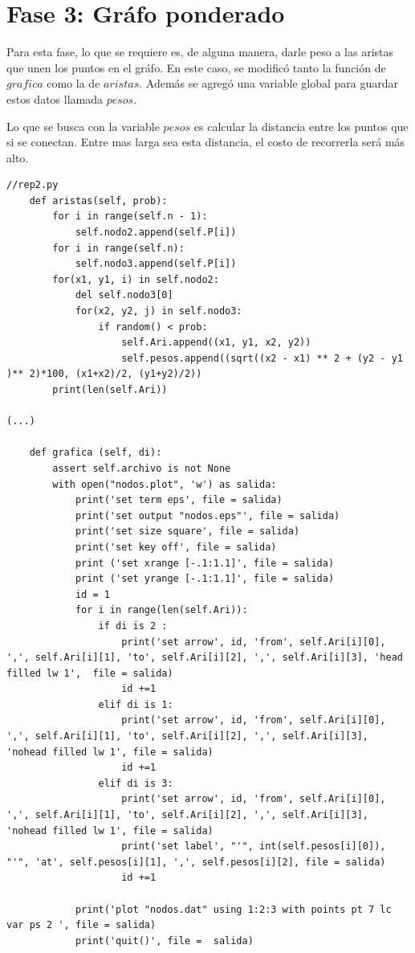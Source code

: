 \documentclass{article}%
\begin{document}
\section*{Fase 3: Gr\'afo ponderado}

Para esta fase, lo que se requiere es, de alguna manera, darle peso a las aristas que unen los puntos en el gr\'afo. En este caso, se modific\'o tanto la funci\'on de $grafica$ como la de $aristas$. Adem\'as se agreg\'o una variable global para guardar estos datos llamada $pesos$.

Lo que se busca con la variable $pesos$ es calcular la distancia entre los puntos que si se conectan. Entre mas larga sea esta distancia, el costo de recorrerla ser\'a m\'as alto.

\begin{lstlisting}
//rep2.py
	def aristas(self, prob):
		for i in range(self.n - 1):
			self.nodo2.append(self.P[i])
		for i in range(self.n):
			self.nodo3.append(self.P[i])
		for(x1, y1, i) in self.nodo2:
			del self.nodo3[0]
			for(x2, y2, j) in self.nodo3:
				if random() < prob:
					self.Ari.append((x1, y1, x2, y2))
					self.pesos.append((sqrt((x2 - x1) ** 2 + (y2 - y1 )** 2)*100, (x1+x2)/2, (y1+y2)/2))
		print(len(self.Ari))

(...)		
		
	def grafica (self, di):
		assert self.archivo is not None
		with open("nodos.plot", 'w') as salida: 
			print('set term eps', file = salida)
			print('set output "nodos.eps"', file = salida)
			print('set size square', file = salida)
			print('set key off', file = salida)
			print ('set xrange [-.1:1.1]', file = salida)
			print ('set yrange [-.1:1.1]', file = salida)
			id = 1
			for i in range(len(self.Ari)):
				if di is 2 :
					print('set arrow', id, 'from', self.Ari[i][0], ',', self.Ari[i][1], 'to', self.Ari[i][2], ',', self.Ari[i][3], 'head filled lw 1',  file = salida)
					id +=1
				elif di is 1:
					print('set arrow', id, 'from', self.Ari[i][0], ',', self.Ari[i][1], 'to', self.Ari[i][2], ',', self.Ari[i][3], 'nohead filled lw 1', file = salida)
					id +=1
				elif di is 3:
					print('set arrow', id, 'from', self.Ari[i][0], ',', self.Ari[i][1], 'to', self.Ari[i][2], ',', self.Ari[i][3], 'nohead filled lw 1', file = salida)
					print('set label', "'", int(self.pesos[i][0]), "'", 'at', self.pesos[i][1], ',', self.pesos[i][2], file = salida)
					id +=1

			print('plot "nodos.dat" using 1:2:3 with points pt 7 lc var ps 2 ', file = salida)
			print('quit()', file =  salida)
		
\end{lstlisting}
\end{document}
